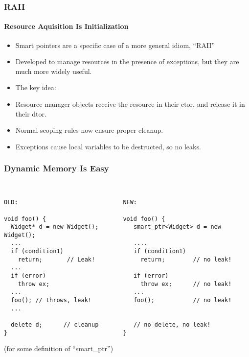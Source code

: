 \begin{frame}[fragile,t]
\frametitle{RAII}
\framesubtitle{Resource Aquisition Is Initialization}
\begin{itemize}
\item Smart pointers are a specific case of a more general idiom, ``RAII''
\item Developed to manage resources in the presence of exceptions, but
  they are much more widely useful.
\item The key idea:  
\item Resource manager objects receive the resource in their
  ctor, and release it in their dtor.
\item Normal scoping rules now ensure proper cleanup.
\item Exceptions cause local variables to be destructed, so no leaks.
\end{itemize}
\vskip 12pt
\pause{}
\pause{}
\center{\Emph{\texttt{\}}}}

\end{frame}


\begin{frame}[fragile,t]
\frametitle{Dynamic Memory Is Easy}
{\scriptsize\
\begin{verbatim}
OLD:                              NEW:

void foo() {                      void foo() {
  Widget* d = new Widget();          smart_ptr<Widget> d = new Widget();
  ...                                ....
  if (condition1)                    if (condition1) 
    return;       // Leak!             return;        // no leak!
  ...
  if (error)                         if (error)
    throw ex;                          throw ex;      // no leak!
  ...                                ...
  foo(); // throws, leak!            foo();           // no leak!
  ...             

  delete d;      // cleanup          // no delete, no leak!
}                                 } 
\end{verbatim}
}

(for some definition of ``smart\_ptr'')
\end{frame}

